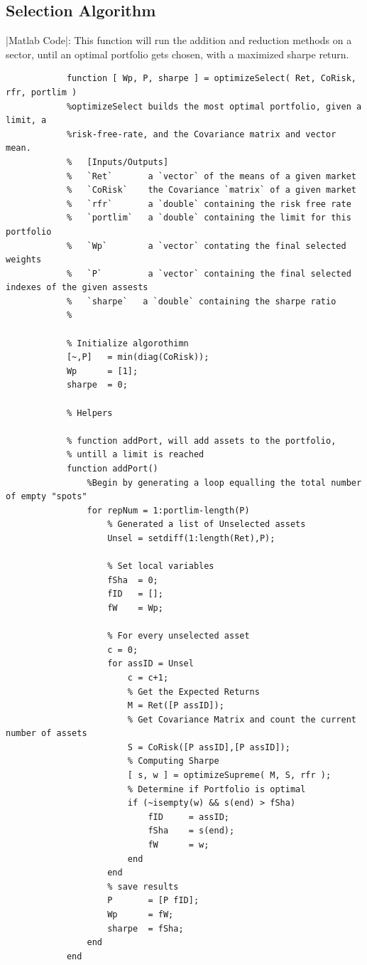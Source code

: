 \documentclass[12pt,titlepage,letter]{article}
\begin{document}
	\subsection{Selection Algorithm}
		|Matlab Code|: This function will run the addition and reduction methods on a sector, until an optimal portfolio gets chosen, with a maximized sharpe return.
		\begin{verbatim}
			function [ Wp, P, sharpe ] = optimizeSelect( Ret, CoRisk, rfr, portlim )
			%optimizeSelect builds the most optimal portfolio, given a limit, a
			%risk-free-rate, and the Covariance matrix and vector mean.
			%   [Inputs/Outputs]
			%   `Ret`       a `vector` of the means of a given market
			%   `CoRisk`    the Covariance `matrix` of a given market
			%   `rfr`       a `double` containing the risk free rate
			%   `portlim`   a `double` containing the limit for this portfolio
			%   `Wp`        a `vector` contating the final selected weights
			%   `P`         a `vector` containing the final selected indexes of the given assests
			%   `sharpe`   a `double` containing the sharpe ratio
			%

			% Initialize algorothimn
			[~,P]   = min(diag(CoRisk));
			Wp      = [1];
			sharpe  = 0;

			% Helpers

			% function addPort, will add assets to the portfolio,
			% untill a limit is reached
			function addPort()
			    %Begin by generating a loop equalling the total number of empty "spots"
			    for repNum = 1:portlim-length(P)
			        % Generated a list of Unselected assets
			        Unsel = setdiff(1:length(Ret),P);

			        % Set local variables
			        fSha  = 0;
			        fID   = [];
			        fW    = Wp;

			        % For every unselected asset
			        c = 0;
			        for assID = Unsel
			            c = c+1;
			            % Get the Expected Returns
			            M = Ret([P assID]);
			            % Get Covariance Matrix and count the current number of assets
			            S = CoRisk([P assID],[P assID]);
			            % Computing Sharpe
			            [ s, w ] = optimizeSupreme( M, S, rfr );
			            % Determine if Portfolio is optimal
			            if (~isempty(w) && s(end) > fSha)
			                fID     = assID;
			                fSha    = s(end);
			                fW      = w;
			            end
			        end
			        % save results
			        P       = [P fID];
			        Wp      = fW;
			        sharpe  = fSha;
			    end
			end


\end{verbatim}
\end{document}
